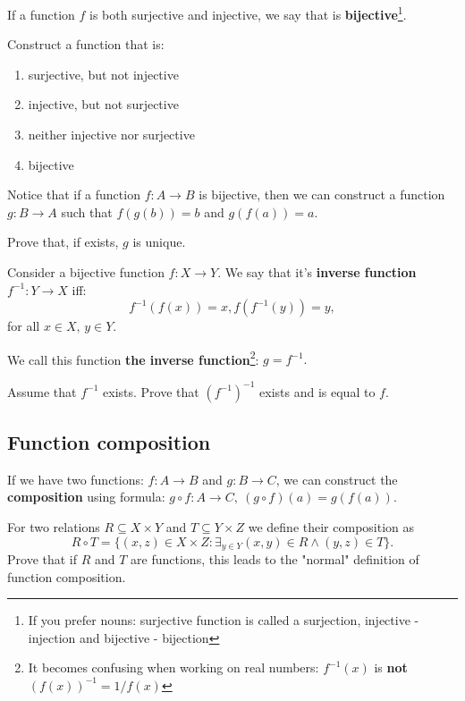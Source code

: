 \begin{definition}
  If a function $f$ is both surjective and injective, we say that is \textbf{bijective}\footnote{If you prefer nouns: surjective function is called a surjection, injective - injection and bijective - bijection}.
\end{definition}

\begin{exercise}
	Construct a function that is:
	\begin{enumerate}
		\item surjective, but not injective
		\item injective, but not surjective
		\item neither injective nor surjective
		\item bijective
	\end{enumerate}
\end{exercise}

\noindent Notice that if a function $f: A\to B$ is bijective, then we can construct a function $g:B\to A$
such that $f(g(b))=b$ and $g(f(a))=a$.

\begin{exercise}
	Prove that, if exists, $g$ is unique.
\end{exercise}

\begin{definition}
  Consider a bijective function $f:X\to Y$. We say that it's \textbf{inverse function} $f^{-1}:Y\to X$ iff:
  $$f^{-1}(f(x))=x, f(f^{-1}(y))=y,$$
  for all $x\in X,\, y\in Y$.
\end{definition}

\noindent We call this function \textbf{the inverse function}\footnote{It becomes confusing when working on real numbers: $f^{-1}(x)$ is
\textbf{not} $(f(x))^{-1}=1/f(x)$}: $g=f^{-1}.$

\begin{exercise}
	Assume that $f^{-1}$ exists. Prove that $(f^{-1})^{-1}$ exists and is equal to $f$.
\end{exercise}

\subsection{Function composition}
If we have two functions: $f:A\to B$ and $g: B\to C$, we can construct the \textbf{composition} using formula:
$g\circ f: A\to C,~(g\circ f)(a) = g(f(a)).$

\begin{exercise}
  For two relations $R\subseteq X\times Y$ and $T\subseteq Y\times Z$ we define their composition as $$R\circ T=\{(x,z)\in X\times Z : \exists_{y\in Y} (x,y)\in R \wedge (y,z)\in T\}.$$
  Prove that if $R$ and $T$ are functions, this leads to the "normal" definition of function composition.
\end{exercise}

